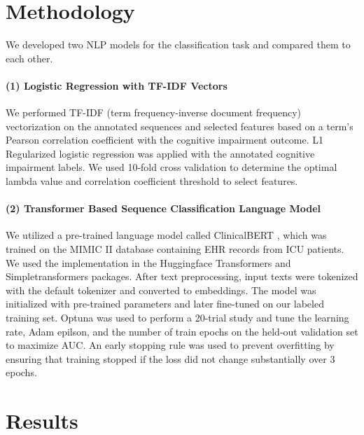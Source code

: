 \documentclass[pmlr,twocolumn,10pt]{jmlr} %
\begin{document}
\section{Methodology}

We developed two NLP models for the classification task and compared them to each other.

\label{sec:TFIDF}  
\paragraph{(1) Logistic Regression with TF-IDF Vectors} We performed TF-IDF (term frequency-inverse document frequency) vectorization on the annotated sequences and selected features based on a term's Pearson correlation coefficient with the cognitive impairment outcome. L1 Regularized logistic regression \citep{tibshirani1996regression} was applied with the annotated cognitive impairment labels. We used 10-fold cross validation to determine the optimal lambda value and correlation coefficient threshold to select features. 

\label{sec:Transformer}  
\paragraph{(2) Transformer Based Sequence Classification Language Model} We utilized a pre-trained language model called ClinicalBERT \citep{alsentzer-etal-2019-publicly}, which was trained on the MIMIC II \citep{saeed2011multiparameter} database containing EHR records from ICU patients. We used the implementation in the Huggingface Transformers \citep{Wolf2019HuggingFacesTS} and Simpletransformers \citep{simple2020thilina} packages. After text preprocessing, input texts were tokenized with the default tokenizer and converted to embeddings. The model was initialized with pre-trained parameters and later fine-tuned on our labeled training set. Optuna \citep{akiba2019optuna} was used to perform a 20-trial study and tune the learning rate, Adam epilson, and the number of train epochs on the held-out validation set to maximize AUC. An early stopping rule was used to prevent overfitting by ensuring that training stopped if the loss did not change substantially over 3 epochs.

\section{Results}
\label{sec:Results}  

\end{document}
